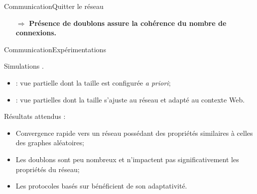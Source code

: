 \begin{frame}{Communication}{Quitter le réseau}

  \vspace{1cm}
  \large
  \begin{itemize}
  \item [$\Rightarrow$] \textbf{Présence de doublons assure la cohérence du
      nombre de connexions.}
  \end{itemize}
 
\end{frame}


\begin{frame}{Communication}{Expérimentations}

  Simulations \PEERSIM.

  \vspace{0.5cm}

  \begin{itemize}
  \item \CYCLON : vue partielle dont la taille est configurée \textit{a priori};
  \item \SPRAY : vue partielles dont la taille s'ajuste au réseau et adapté au
    contexte Web.
  \end{itemize}


  
  \vspace{0.5cm}


  Résultats attendus :
  \begin{itemize}
  \item Convergence rapide vers un réseau possédant des propriétés similaires à
    celles des graphes aléatoires;
  \item Les doublons sont peu nombreux et n'impactent pas significativement les
    propriétés du réseau;
  \item Les protocoles basés sur \SPRAY bénéficient de son adaptativité.
  \end{itemize}

\end{frame}


